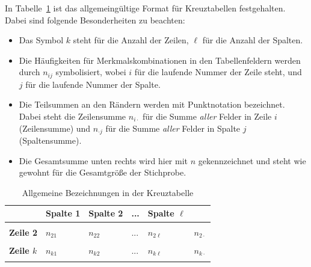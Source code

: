 \documentclass[
  11pt,
  ngerman,
  a4paper,
]{report}
\providecommand{\tightlist}{%
  \setlength{\itemsep}{0pt}\setlength{\parskip}{0pt}}
\begin{document}
In Tabelle~\ref{tab:crossalg} ist das allgemeingültige Format für Kreuztabellen festgehalten. Dabei sind folgende Besonderheiten zu beachten:

\begin{itemize}
\tightlist
\item
  Das Symbol \(k\) steht für die Anzahl der Zeilen, \(\ell\) für die Anzahl der Spalten.
\item
  Die Häufigkeiten für Merkmalskombinationen in den Tabellenfeldern werden durch \(n_{ij}\) symbolisiert, wobei \(i\) für die laufende Nummer der Zeile steht, und \(j\) für die laufende Nummer der Spalte.
\item
  Die Teilsummen an den Rändern werden mit Punktnotation bezeichnet. Dabei steht die Zeilensumme \(n_{i\cdot}\) für die Summe \emph{aller} Felder in Zeile \(i\) (Zeilensumme) und \(n_{\cdot j}\) für die Summe \emph{aller} Felder in Spalte \(j\) (Spaltensumme).
\item
  Die Gesamtsumme unten rechts wird hier mit \(n\) gekennzeichnet und steht wie gewohnt für die Gesamtgröße der Stichprobe.
\end{itemize}

\begin{table}

\caption{\label{tab:crossalg}Allgemeine Bezeichnungen in der Kreuztabelle}
\centering
\begin{tabular}[t]{>{}l|lll>{}l|>{}l}
\toprule
\textbf{ } & \textbf{Spalte 1} & \textbf{Spalte 2} & \textbf{...} & \textbf{Spalte $\ell$} & \textbf{  }\\
\midrule
\cellcolor{gray!6}{\textbf{Zeile 1}} & \cellcolor{gray!6}{$n_{11}$} & \cellcolor{gray!6}{$n_{12}$} & \cellcolor{gray!6}{...} & \cellcolor{gray!6}{$n_{1\ell}$} & \cellcolor{gray!6}{\textbf{$n_{1\cdot}$}}\\
\textbf{Zeile 2} & $n_{21}$ & $n_{22}$ & ... & $n_{2\ell}$ & \textbf{$n_{2\cdot}$}\\
\cellcolor{gray!6}{\textbf{...}} & \cellcolor{gray!6}{...} & \cellcolor{gray!6}{...} & \cellcolor{gray!6}{...} & \cellcolor{gray!6}{...} & \cellcolor{gray!6}{\textbf{...}}\\
\textbf{Zeile $k$} & $n_{k1}$ & $n_{k2}$ & ... & $n_{k\ell}$ & \textbf{$n_{k\cdot}$}\\
\midrule
\cellcolor{gray!6}{\textbf{\textbf{}}} & \cellcolor{gray!6}{\textbf{$n_{\cdot1}$}} & \cellcolor{gray!6}{\textbf{$n_{\cdot2}$}} & \cellcolor{gray!6}{\textbf{...}} & \cellcolor{gray!6}{\textbf{$n_{\cdot\ell}$}} & \cellcolor{gray!6}{\textbf{\textbf{$n$}}}\\
\bottomrule
\end{tabular}
\end{table}
\end{document}
